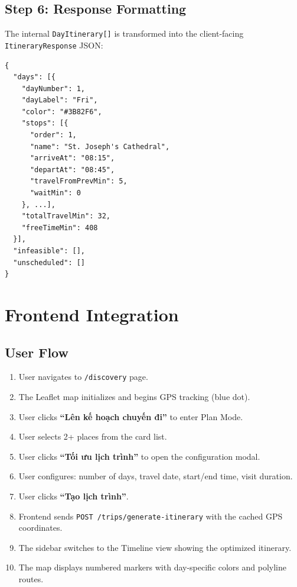 \documentclass[12pt,a4paper]{report}
\begin{document}
\subsection{Step 6: Response Formatting}

The internal \texttt{DayItinerary[]} is transformed into the client-facing \texttt{ItineraryResponse} JSON:

\begin{verbatim}
{
  "days": [{
    "dayNumber": 1,
    "dayLabel": "Fri",
    "color": "#3B82F6",
    "stops": [{
      "order": 1,
      "name": "St. Joseph's Cathedral",
      "arriveAt": "08:15",
      "departAt": "08:45",
      "travelFromPrevMin": 5,
      "waitMin": 0
    }, ...],
    "totalTravelMin": 32,
    "freeTimeMin": 408
  }],
  "infeasible": [],
  "unscheduled": []
}
\end{verbatim}

\section{Frontend Integration}

\subsection{User Flow}

\begin{enumerate}
    \item User navigates to \texttt{/discovery} page.
    \item The Leaflet map initializes and begins GPS tracking (blue dot).
    \item User clicks \textbf{``Lên kế hoạch chuyến đi''} to enter Plan Mode.
    \item User selects 2+ places from the card list.
    \item User clicks \textbf{``Tối ưu lịch trình''} to open the configuration modal.
    \item User configures: number of days, travel date, start/end time, visit duration.
    \item User clicks \textbf{``Tạo lịch trình''}.
    \item Frontend sends \texttt{POST /trips/generate-itinerary} with the cached GPS coordinates.
    \item The sidebar switches to the Timeline view showing the optimized itinerary.
    \item The map displays numbered markers with day-specific colors and polyline routes.
\end{enumerate}
\end{document}

